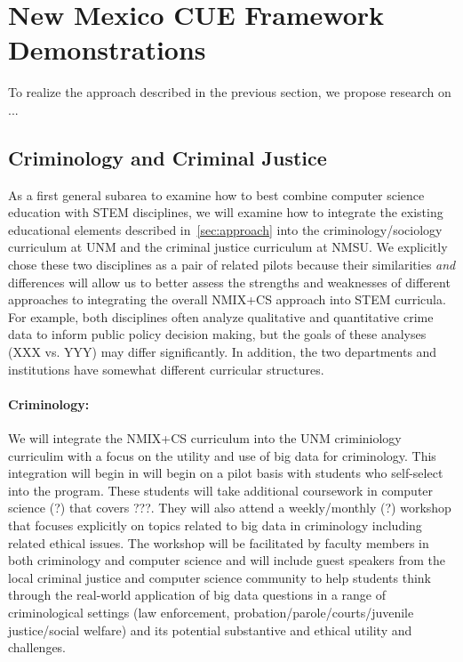 \section{New Mexico CUE Framework Demonstrations}
\label{sec:pilots}

To realize the approach described in the previous section, we propose
research on ...

\subsection{Criminology and Criminal Justice}
\label{sec:demo:crim}

As a first general subarea to examine how to best combine computer science education with STEM disciplines, we will examine how to integrate the existing educational elements described in~\ref{sec:approach} into the criminology/sociology curriculum at UNM and the criminal justice curriculum at NMSU. We explicitly chose these two disciplines as a pair of related pilots because their similarities \emph{and} differences will allow us to better assess the strengths and weaknesses of different approaches to integrating the overall NMIX+CS approach into STEM curricula. For example, both disciplines often analyze qualitative and quantitative crime data to inform public policy decision making, but the goals of these analyses (XXX vs. YYY) may differ significantly. In addition, the two departments and institutions have somewhat different curricular structures. 

\paragraph{Criminology:} We will integrate the NMIX+CS curriculum into the UNM criminiology curriculim with a focus on the utility and use of big data for criminology. This integration will begin in  will begin on a pilot basis with students who self-select into the program. These students will take additional coursework in computer science (?) that covers ???. They will also attend a weekly/monthly (?) workshop that focuses explicitly on topics related to big data in criminology including related ethical issues. The workshop will be facilitated by faculty members in both criminology and computer science and will include guest speakers from the local criminal justice and computer science community to help students think through the real-world application of big data questions in a range of criminological settings (law enforcement, probation/parole/courts/juvenile justice/social welfare) and its potential substantive and ethical utility and challenges.


